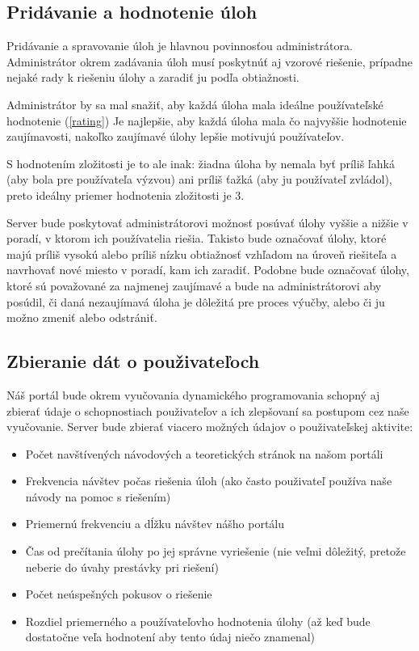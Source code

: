 \subsection{Pridávanie a hodnotenie úloh}
Pridávanie a spravovanie úloh je hlavnou povinnosťou administrátora. Administrátor okrem zadávania úloh musí poskytnúť aj vzorové riešenie, prípadne nejaké rady k riešeniu úlohy a zaradiť ju podľa obtiažnosti.

Administrátor by sa mal snažiť, aby každá úloha mala ideálne používateľské hodnotenie (\ref{rating})
Je najlepšie, aby každá úloha mala čo najvyššie hodnotenie zaujímavosti, nakoľko zaujímavé úlohy lepšie motivujú používateľov.

S hodnotením zložitosti je to ale inak: žiadna úloha by nemala byť príliš ľahká (aby bola pre používateľa výzvou) ani
príliš ťažká (aby ju používateľ zvládol), preto ideálny priemer hodnotenia zložitosti je 3.

Server bude poskytovať administrátorovi možnosť posúvať úlohy vyššie a nižšie v poradí, v ktorom ich používatelia riešia. Takisto bude označovať úlohy, ktoré majú príliš vysokú alebo príliš nízku obtiažnosť vzhľadom na úroveň riešiteľa a navrhovať nové miesto v poradí, kam ich zaradiť. Podobne bude označovať úlohy, ktoré sú považované za najmenej zaujímavé a bude na administrátorovi aby posúdil, či daná nezaujímavá úloha je dôležitá pre proces výučby, alebo či ju možno zmeniť alebo odstrániť.
\subsection{Zbieranie dát o použivateľoch}
\label{zbieraniedata}
Náš portál bude okrem vyučovania dynamického programovania schopný aj zbierať údaje o schopnostiach použivateľov a ich zlepšovaní sa postupom cez naše vyučovanie. Server bude zbierať viacero možných údajov o použivateľskej aktivite:
\begin{itemize}
\item Počet navštívených návodových a teoretických stránok na našom portáli
\item Frekvencia návštev počas riešenia úloh (ako často použivateľ používa naše návody na pomoc s riešením)
\item Priemernú frekvenciu a dĺžku návštev nášho portálu
\item Čas od prečítania úlohy po jej správne vyriešenie (nie veľmi dôležitý, pretože neberie do úvahy prestávky pri riešení)
\item Počet neúspešných pokusov o riešenie
\item Rozdiel priemerného a používateľovho hodnotenia úlohy (až keď bude dostatočne veľa hodnotení aby tento údaj niečo znamenal)
\end{itemize}

